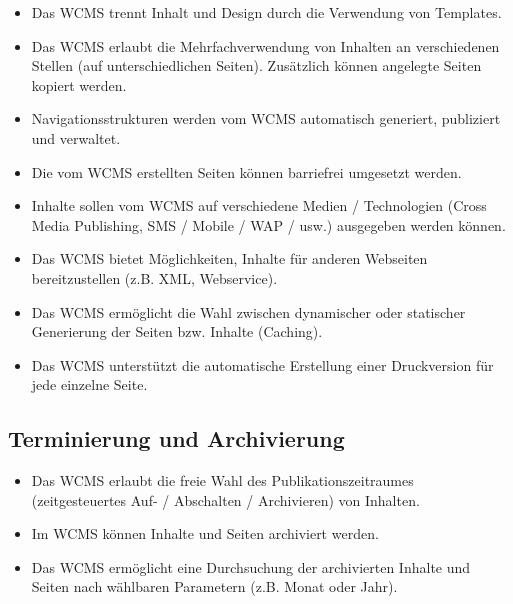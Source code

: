 \begin{itemize}
\item
Das WCMS trennt Inhalt und Design durch die Verwendung von Templates.
\item
Das WCMS erlaubt die Mehrfachverwendung von Inhalten an verschiedenen Stellen (auf unterschiedlichen Seiten). Zusätzlich können angelegte Seiten kopiert werden.
\item
Navigationsstrukturen werden vom WCMS automatisch generiert, publiziert und verwaltet.
\item
Die vom WCMS erstellten Seiten können barriefrei umgesetzt werden.
\item
Inhalte sollen vom WCMS auf verschiedene Medien / Technologien (Cross Media Publishing, SMS / Mobile / WAP / usw.) ausgegeben werden können.
\item
Das WCMS bietet Möglichkeiten, Inhalte für anderen Webseiten bereitzustellen (z.B. XML, Webservice).
\item
Das WCMS ermöglicht die Wahl zwischen dynamischer oder statischer Generierung der Seiten bzw. Inhalte (Caching).
\item
Das WCMS unterstützt die automatische Erstellung einer Druckversion für jede einzelne Seite.
\end{itemize}


\subsection{Terminierung und Archivierung}
\label{sec:archi}
\begin{itemize}
\item
Das WCMS erlaubt die freie Wahl des Publikationszeitraumes (zeitgesteuertes Auf- / Abschalten / Archivieren) von Inhalten.
\item
Im WCMS können Inhalte und Seiten archiviert werden.
\item
Das WCMS ermöglicht eine Durchsuchung der archivierten Inhalte und Seiten nach wählbaren Parametern (z.B. Monat oder Jahr).
\end{itemize}



